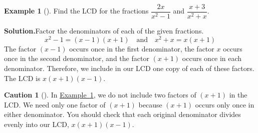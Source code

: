 \documentclass[10pt,]{book}
\theoremstyle{plain}
\theoremstyle{definition}
\newtheorem{warning}[theorem]{Caution}
\theoremstyle{definition}
\newtheorem{example}[theorem]{Example}
\theoremstyle{definition}
\numberwithin{equation}{part}
\begin{document}
\begin{example}[]\label{example-LCD2}
Find the LCD for the fractions \(\dfrac{2x}{x^2-1}\) and \(\dfrac{x+3}{x^2+x}\).%
\par\medskip\noindent%
\textbf{Solution.}\quad Factor the denominators of each of the given fractions.%
\begin{equation*}
x^2 − 1 = (x − 1) (x + 1)~~~\text{ and }~~~x^2 + x = x (x + 1)
\end{equation*}
The factor \((x − 1)\) occurs once in the first denominator, the factor \(x\) occurs once in the second denominator, and the factor \((x + 1)\) occurs once in each denominator. Therefore, we include in our LCD one copy of each of these factors. The LCD is \(x (x + 1) (x − 1)\).%
\end{example}
\begin{warning}[]\label{warning-12}
In \hyperref[example-LCD2]{Example~\ref{example-LCD2}}, we do not include two factors of \((x + 1)\) in the LCD. We need only one factor of \((x + 1)\) because \((x + 1)\) occurs only once in either denominator. You should check that each original denominator divides evenly into our LCD, \(x (x + 1)(x − 1)\).%
\end{warning}
\typeout{************************************************}
\typeout{************************************************}
\end{document}
